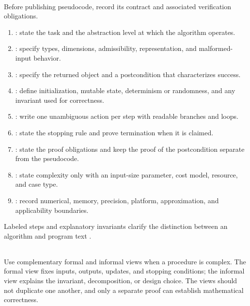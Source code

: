 \begin{process} \label{proc:algorithm-specification-audit} \\
Before publishing pseudocode, record its contract and associated verification obligations.
\begin{enumerate}[label=(\roman*)]
\setlength{\itemsep}{0pt}
\item {}: state the task and the abstraction level at which the algorithm operates.
\item {}: specify types, dimensions, admissibility, representation, and malformed-input behavior.
\item {}: specify the returned object and a postcondition that characterizes success.
\item {}: define initialization, mutable state, determinism or randomness, and any invariant used for correctness.
\item {}: write one unambiguous action per step with readable branches and loops.
\item {}: state the stopping rule and prove termination when it is claimed.
\item {}: state the proof obligations and keep the proof of the postcondition separate from the pseudocode.
\item {}: state complexity only with an input-size parameter, cost model, resource, and case type.
\item {}: record numerical, memory, precision, platform, approximation, and applicability boundaries.
\end{enumerate}
Labeled steps and explanatory invariants clarify the distinction between an algorithm and program text \citep{knuth1988mathematicalwriting}.
\end{process}

\begin{principle} \label{princ:formal-informal-procedural-pair} \\
Use complementary formal and informal views when a procedure is complex. The formal view fixes inputs, outputs, updates, and stopping conditions; the informal view explains the invariant, decomposition, or design choice. The views should not duplicate one another, and only a separate proof can establish mathematical correctness.
\end{principle}

